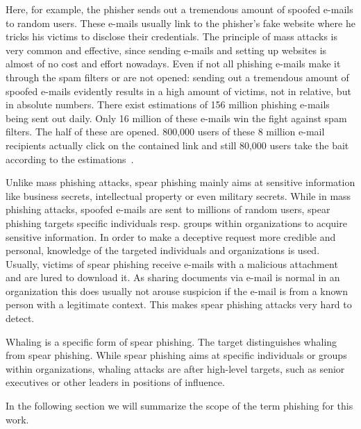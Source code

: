 \begin{description}[leftmargin=0cm]
	\item[Mass Phishing] Here, for example, the phisher sends out a tremendous amount of spoofed e-mails to random users. These e-mails usually link to the phisher's fake website where he tricks his victims to disclose their credentials. The principle of mass attacks is very common and effective, since sending e-mails and setting up websites is almost of no cost and effort nowadays. Even if not all phishing e-mails make it through the spam filters or are not opened: sending out a tremendous amount of spoofed e-mails evidently results in a high amount of victims, not in relative, but in absolute numbers. There exist estimations of 156 million phishing e-mails being sent out daily. Only 16 million of these e-mails win the fight against spam filters. The half of these are opened. 800,000 users of these 8 million e-mail recipients actually click on the contained link and still 80,000 users take the bait according to the estimations~\cite{takethebait}.
	\item[Spear Phishing] Unlike mass phishing attacks, spear phishing mainly aims at sensitive information like business secrets, intellectual property or even military secrets. While in mass phishing attacks, spoofed e-mails are sent to millions of random users, spear phishing targets specific individuals resp. groups within organizations to acquire sensitive information. In order to make a deceptive request more credible and personal, knowledge of the targeted individuals and organizations is used. Usually, victims of spear phishing receive e-mails with a malicious attachment and are lured to download it. As sharing documents via e-mail is normal in an organization this does usually not arouse suspicion if the e-mail is from a known person with a legitimate context. This makes spear phishing attacks very hard to detect\cite{trendlabs2012spear,statephishinghong}.
	\item[Whaling] Whaling is a specific form of spear phishing. The target distinguishes whaling from spear phishing. While spear phishing aims at specific individuals or groups within organizations, whaling attacks are after high-level targets, such as senior executives or other leaders in positions of influence.
\end{description}

 In the following section we will summarize the scope of the term phishing for this work.
